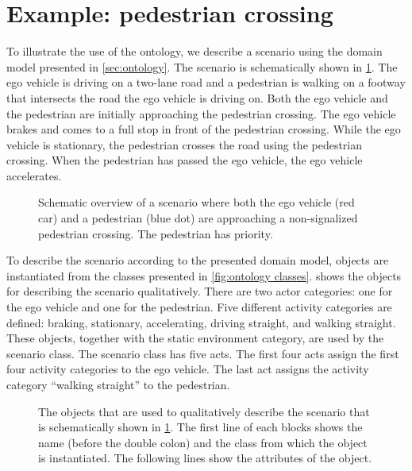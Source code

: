 \section{Example: pedestrian crossing}
\label{sec:example}

To illustrate the use of the ontology, we describe a scenario using the domain model presented in \cref{sec:ontology}. The scenario is schematically shown in \cref{fig:scenario overview}. The ego vehicle is driving on a two-lane road and a pedestrian is walking on a footway that intersects the road the ego vehicle is driving on. Both the ego vehicle and the pedestrian are initially approaching the pedestrian crossing. The ego vehicle brakes and comes to a full stop in front of the pedestrian crossing. While the ego vehicle is stationary, the pedestrian crosses the road using the pedestrian crossing. When the pedestrian has passed the ego vehicle, the ego vehicle accelerates.

\setlength{\figurewidth}{\linewidth}
\begin{figure}
	\centering
	
	\caption{Schematic overview of a scenario where both the ego vehicle (red car) and a pedestrian (blue dot) are approaching a non-signalized pedestrian crossing. The pedestrian has priority.}
	\label{fig:scenario overview}
\end{figure}


To describe the scenario according to the presented domain model, objects are instantiated from the classes presented in \cref{fig:ontology classes}.  shows the objects for describing the scenario qualitatively. There are two actor categories: one for the ego vehicle and one for the pedestrian. Five different activity categories are defined: braking, stationary, accelerating, driving straight, and walking straight. These objects, together with the static environment category, are used by the scenario class. The scenario class has five acts. The first four acts assign the first four activity categories to the ego vehicle. The last act assigns the activity category ``walking straight'' to the pedestrian.

\begin{figure}
	\centering
	
	\caption{The objects that are used to qualitatively describe the scenario that is schematically shown in \cref{fig:scenario overview}. The first line of each blocks shows the name (before the double colon) and the class from which the object is instantiated. The following lines show the attributes of the object.}
	\label{fig:example qualitative}
\end{figure}


